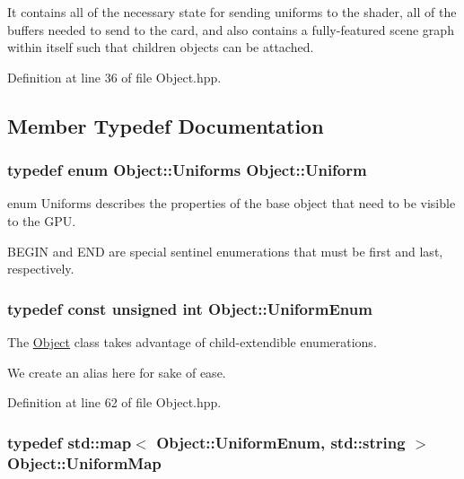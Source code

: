 It contains all of the necessary state for sending uniforms to the shader, all of the buffers needed to send to the card, and also contains a fully-\/featured scene graph within itself such that children objects can be attached. 

Definition at line 36 of file Object.\-hpp.



\subsection{Member Typedef Documentation}
\hypertarget{class_object_ae6a2969ddca87d2c54b7cb1c131a7d60}{
\subsubsection[{Uniform}]{\setlength{\rightskip}{0pt plus 5cm}typedef enum {\bf Object\-::\-Uniforms}  {\bf Object\-::\-Uniform}}}\label{class_object_ae6a2969ddca87d2c54b7cb1c131a7d60}


enum Uniforms describes the properties of the base object that need to be visible to the G\-P\-U. 

B\-E\-G\-I\-N and E\-N\-D are special sentinel enumerations that must be first and last, respectively. \hypertarget{class_object_a79b74057dbc5182b85c9c3ba8480fcf2}{
\subsubsection[{Uniform\-Enum}]{\setlength{\rightskip}{0pt plus 5cm}typedef const unsigned int {\bf Object\-::\-Uniform\-Enum}}}\label{class_object_a79b74057dbc5182b85c9c3ba8480fcf2}


The \hyperlink{class_object}{Object} class takes advantage of child-\/extendible enumerations. 

We create an alias here for sake of ease. 

Definition at line 62 of file Object.\-hpp.

\hypertarget{class_object_a6e19bd8516360bff956408cbae33b878}{
\subsubsection[{Uniform\-Map}]{\setlength{\rightskip}{0pt plus 5cm}typedef std\-::map$<$ {\bf Object\-::\-Uniform\-Enum}, std\-::string $>$ {\bf Object\-::\-Uniform\-Map}}}\label{class_object_a6e19bd8516360bff956408cbae33b878}


